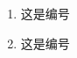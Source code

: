 \documentclass[nofonts]{ctexart}
\begin{document}
\begin{enumerate}
	\item 这是编号 \theenumi
	\item 这是编号 \theenumi
\end{enumerate}
\end{document}
